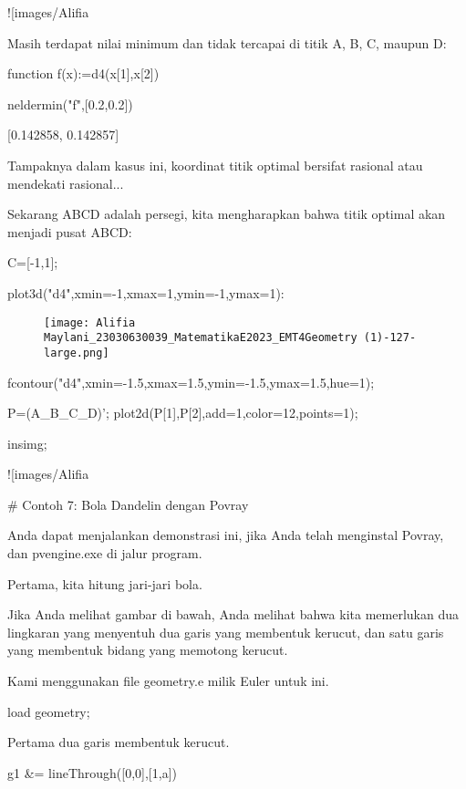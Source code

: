 \documentclass{article}
\begin{document}
![images/Alifia%

Masih terdapat nilai minimum dan tidak tercapai di titik A, B, C,
maupun D:


\>function f(x):=d4(x[1],x[2])

\>neldermin("f",[0.2,0.2])


    [0.142858,  0.142857]

Tampaknya dalam kasus ini, koordinat titik optimal bersifat rasional
atau mendekati rasional...


Sekarang ABCD adalah persegi, kita mengharapkan bahwa titik optimal
akan menjadi pusat ABCD:


\>C=[-1,1];

\>plot3d("d4",xmin=-1,xmax=1,ymin=-1,ymax=1):


\begin{figure}
    \centering
    \texttt{[image: Alifia Maylani\_23030630039\_MatematikaE2023\_EMT4Geometry (1)-127-large.png]}
    \caption{}
    \label{fig:enter-label}
\end{figure}

\>fcontour("d4",xmin=-1.5,xmax=1.5,ymin=-1.5,ymax=1.5,hue=1);

\>P=(A\_B\_C\_D)'; plot2d(P[1],P[2],add=1,color=12,points=1);

\>insimg;


![images/Alifia%

# Contoh 7: Bola Dandelin dengan Povray

Anda dapat menjalankan demonstrasi ini, jika Anda telah menginstal
Povray, dan pvengine.exe di jalur program.


Pertama, kita hitung jari-jari bola.


Jika Anda melihat gambar di bawah, Anda melihat bahwa kita memerlukan
dua lingkaran yang menyentuh dua garis yang membentuk kerucut, dan
satu garis yang membentuk bidang yang memotong kerucut.


Kami menggunakan file geometry.e milik Euler untuk ini.


\>load geometry;


Pertama dua garis membentuk kerucut.


\>g1 &= lineThrough([0,0],[1,a])
\end{document}
